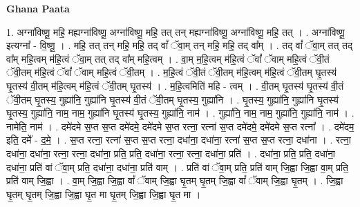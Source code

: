 \documentclass[17pt]{extarticle}
\begin{document}
\textbf{Ghana Paata } \newline

1. अग्ना॑विष्णू॒ महि॒ मह्यग्ना॑विष्णू॒ अग्ना॑विष्णू॒ महि॒ तत् तन् मह्यग्ना॑विष्णू॒ अग्ना॑विष्णू॒ महि॒ तत् । . अग्ना॑विष्णू॒ इत्यग्ना᳚ - वि॒ष्णू॒ । . महि॒ तत् तन् महि॒ महि॒ तद् वां᳚ ॅवा॒म् तन् महि॒ महि॒ तद् वा᳚म् । . तद् वां᳚ ॅवा॒म् तत् तद् वा᳚म् महि॒त्वम् म॑हि॒त्वं ॅवा॒म् तत् तद् वा᳚म् महि॒त्वम् । . वा॒म् म॒हि॒त्वम् म॑हि॒त्वं ॅवां᳚ ॅवाम् महि॒त्वं ॅवी॒तं ॅवी॒तम् म॑हि॒त्वं ॅवां᳚ ॅवाम् महि॒त्वं ॅवी॒तम् । . म॒हि॒त्वं ॅवी॒तं ॅवी॒तम् म॑हि॒त्वम् म॑हि॒त्वं ॅवी॒तम् घृ॒तस्य॑ घृ॒तस्य॑ वी॒तम् म॑हि॒त्वम् म॑हि॒त्वं ॅवी॒तम् घृ॒तस्य॑ । . म॒हि॒त्वमिति॑ महि - त्वम् । . वी॒तम् घृ॒तस्य॑ घृ॒तस्य॑ वी॒तं ॅवी॒तम् घृ॒तस्य॒ गुह्या॑नि॒ गुह्या॑नि घृ॒तस्य॑ वी॒तं ॅवी॒तम् घृ॒तस्य॒ गुह्या॑नि । . घृ॒तस्य॒ गुह्या॑नि॒ गुह्या॑नि घृ॒तस्य॑ घृ॒तस्य॒ गुह्या॑नि॒ नाम॒ नाम॒ गुह्या॑नि घृ॒तस्य॑ घृ॒तस्य॒ गुह्या॑नि॒ नाम॑ । . गुह्या॑नि॒ नाम॒ नाम॒ गुह्या॑नि॒ गुह्या॑नि॒ नाम॑ । . नामेति॒ नाम॑ । . दमे॑दमे स॒प्त स॒प्त दमे॑दमे॒ दमे॑दमे स॒प्त रत्ना॒ रत्ना॑ स॒प्त दमे॑दमे॒ दमे॑दमे स॒प्त रत्ना᳚ । . दमे॑दम॒ इति॒ दमे᳚ - द॒मे॒ । . स॒प्त रत्ना॒ रत्ना॑ स॒प्त स॒प्त रत्ना॒ दधा॑ना॒ दधा॑ना॒ रत्ना॑ स॒प्त स॒प्त रत्ना॒ दधा॑ना । . रत्ना॒ दधा॑ना॒ दधा॑ना॒ रत्ना॒ रत्ना॒ दधा॑ना॒ प्रति॒ प्रति॒ दधा॑ना॒ रत्ना॒ रत्ना॒ दधा॑ना॒ प्रति॑ । . दधा॑ना॒ प्रति॒ प्रति॒ दधा॑ना॒ दधा॑ना॒ प्रति॑ वां ॅवा॒म् प्रति॒ दधा॑ना॒ दधा॑ना॒ प्रति॑ वाम् । . प्रति॑ वां ॅवा॒म् प्रति॒ प्रति॑ वाम् जि॒ह्वा जि॒ह्वा वा॒म् प्रति॒ प्रति॑ वाम् जि॒ह्वा । . वा॒म् जि॒ह्वा जि॒ह्वा वां᳚ ॅवाम् जि॒ह्वा घृ॒तम् घृ॒तम् जि॒ह्वा वां᳚ ॅवाम् जि॒ह्वा घृ॒तम् । . जि॒ह्वा घृ॒तम् घृ॒तम् जि॒ह्वा जि॒ह्वा घृ॒त मा घृ॒तम् जि॒ह्वा जि॒ह्वा घृ॒त मा । \newline
\end{document}
